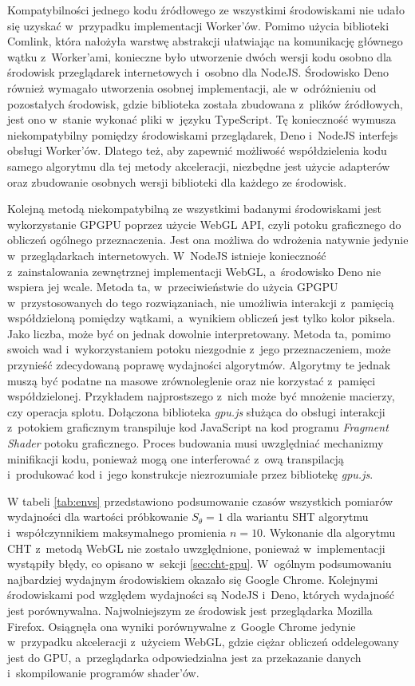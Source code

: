Kompatybilności jednego kodu źródłowego ze wszystkimi środowiskami nie udało się uzyskać w~przypadku implementacji Worker'ów. Pomimo użycia biblioteki Comlink, która nałożyła warstwę abstrakcji ułatwiając na komunikację głównego wątku z~Worker'ami, konieczne było utworzenie dwóch wersji kodu osobno dla środowisk przeglądarek internetowych i~osobno dla NodeJS. Środowisko Deno również wymagało utworzenia osobnej implementacji, ale w~odróżnieniu od pozostałych środowisk, gdzie biblioteka została zbudowana z~plików źródłowych, jest ono w~stanie wykonać pliki w~języku TypeScript. Tę konieczność wymusza niekompatybilny pomiędzy środowiskami przeglądarek, Deno i~NodeJS interfejs obsługi Worker'ów. Dlatego też, aby zapewnić możliwość współdzielenia kodu samego algorytmu dla tej metody akceleracji, niezbędne jest użycie adapterów oraz zbudowanie osobnych wersji biblioteki dla każdego ze środowisk.


Kolejną metodą niekompatybilną ze wszystkimi badanymi środowiskami jest wykorzystanie GPGPU poprzez użycie WebGL API, czyli potoku graficznego do obliczeń ogólnego przeznaczenia. Jest ona możliwa do wdrożenia natywnie jedynie w~przeglądarkach internetowych. W~NodeJS istnieje konieczność z~zainstalowania zewnętrznej implementacji WebGL, a~środowisko Deno nie wspiera jej wcale. Metoda ta, w~przeciwieństwie do użycia GPGPU w~przystosowanych do tego rozwiązaniach, nie umożliwia interakcji z~pamięcią współdzieloną pomiędzy wątkami, a~wynikiem obliczeń jest tylko kolor piksela. Jako liczba, może być on jednak dowolnie interpretowany. Metoda ta, pomimo swoich wad i~wykorzystaniem potoku niezgodnie z~jego przeznaczeniem, może przynieść zdecydowaną poprawę wydajności algorytmów. Algorytmy te jednak muszą być podatne na masowe zrównoleglenie oraz nie korzystać z~pamięci współdzielonej. Przykładem najprostszego z~nich może być mnożenie macierzy, czy operacja splotu. Dołączona biblioteka \textit{gpu.js} służąca do obsługi interakcji z~potokiem graficznym transpiluje kod JavaScript na kod programu \textit{Fragment Shader} potoku graficznego. Proces budowania musi uwzględniać mechanizmy minifikacji kodu, ponieważ mogą one interferować z~ową transpilacją i~produkować kod i~jego konstrukcje niezrozumiałe przez bibliotekę \textit{gpu.js}.



W tabeli \ref{tab:envs} przedstawiono podsumowanie czasów wszystkich pomiarów wydajności dla wartości próbkowanie $S_\theta=1$ dla wariantu SHT algorytmu i~współczynnikiem maksymalnego promienia $n=10$. Wykonanie dla algorytmu CHT z~metodą WebGL nie zostało uwzględnione, ponieważ w~implementacji wystąpiły błędy, co opisano w~sekcji \ref{sec:cht-gpu}. W~ogólnym podsumowaniu najbardziej wydajnym środowiskiem okazało się Google Chrome. Kolejnymi środowiskami pod względem wydajności są NodeJS i~Deno, których wydajność jest porównywalna. Najwolniejszym ze środowisk jest przeglądarka Mozilla Firefox. Osiągnęła ona wyniki porównywalne z~Google Chrome jedynie w~przypadku akceleracji z~użyciem WebGL, gdzie ciężar obliczeń oddelegowany jest do GPU, a~przeglądarka odpowiedzialna jest za przekazanie danych i~skompilowanie programów shader'ów.

